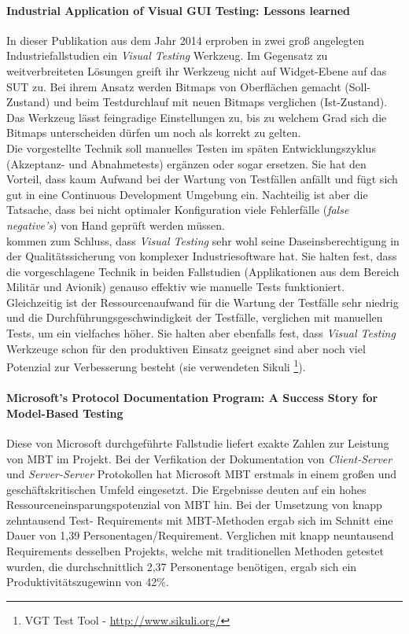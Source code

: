 \paragraph{Industrial Application of Visual GUI Testing: Lessons learned \cite{alegroth_industrial_2014}}In dieser Publikation aus dem Jahr 2014 erproben \citeauthor{alegroth_industrial_2014} in zwei groß angelegten Industriefallstudien ein \textit{Visual Testing} Werkzeug. Im Gegensatz zu weitverbreiteten Lösungen greift ihr Werkzeug nicht auf Widget-Ebene auf das \Gls{SUT} zu. Bei ihrem Ansatz werden Bitmaps von Oberflächen gemacht (Soll-Zustand) und beim Testdurchlauf mit neuen Bitmaps verglichen (Ist-Zustand). Das Werkzeug lässt feingradige Einstellungen zu, bis zu welchem Grad sich die Bitmaps unterscheiden dürfen um noch als korrekt zu gelten.\\
Die vorgestellte Technik soll manuelles Testen im späten Entwicklungszyklus (Akzeptanz- und Abnahmetests) ergänzen oder sogar ersetzen. Sie hat den Vorteil, dass kaum Aufwand bei der Wartung von Testfällen anfällt und fügt sich gut in eine Continuous Development Umgebung ein. Nachteilig ist aber die Tatsache, dass bei nicht optimaler Konfiguration viele Fehlerfälle (\textit{false negative's}) von Hand geprüft werden müssen.\\
\citeauthor{alegroth_industrial_2014} kommen zum Schluss, dass \textit{Visual Testing} sehr wohl seine Daseinsberechtigung in der Qualitätssicherung von komplexer Industriesoftware hat. Sie halten fest, dass die vorgeschlagene Technik in beiden Fallstudien (Applikationen aus dem Bereich Militär und Avionik) genauso effektiv wie manuelle Tests funktioniert. Gleichzeitig ist der Ressourcenaufwand für die Wartung der Testfälle sehr niedrig und die Durchführungsgeschwindigkeit der Testfälle, verglichen mit manuellen Tests, um ein vielfaches höher. Sie halten aber ebenfalls fest, dass \textit{Visual Testing} Werkzeuge schon für den produktiven Einsatz geeignet sind aber noch viel Potenzial zur Verbesserung besteht (sie verwendeten Sikuli \footnote{VGT Test Tool - \url{http://www.sikuli.org/}}).

\paragraph{Microsoft’s Protocol Documentation Program: A Success Story for Model-Based Testing \cite{grieskamp_microsofts_2010}}\label{sec:microsoft_fallstudie}
Diese von Microsoft durchgeführte Fallstudie liefert exakte Zahlen zur Leistung von \Gls{MBT} im Projekt. Bei der Verfikation der Dokumentation von \textit{Client-Server} und \textit{Server-Server} Protokollen hat Microsoft \Gls{MBT} erstmals in einem großen und geschäftskritischen Umfeld eingesetzt. Die Ergebnisse deuten auf ein hohes Ressourceneinsparungspotenzial von \Gls{MBT} hin. Bei der Umsetzung von knapp zehntausend Test- Requirements mit MBT-Methoden ergab sich im Schnitt eine Dauer von 1,39 Personentagen/Requirement. Verglichen mit knapp neuntausend Requirements desselben Projekts, welche mit traditionellen Methoden getestet wurden, die durchschnittlich 2,37 Personentage benötigen, ergab sich ein Produktivitätszugewinn von 42\%.

